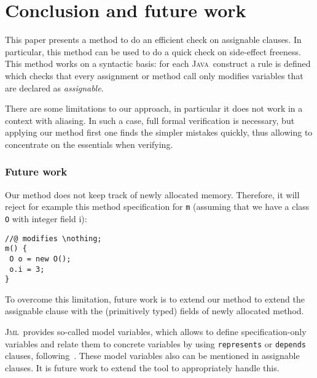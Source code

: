 \documentclass[a4paper]{llncs}
\newcommand{\jml}{\textsc{Jml}}
\newcommand{\java}{\textsc{Java}}
\newcommand{\nothing}{\texttt{\(\backslash\)nothing}}
\begin{document}
\section{Conclusion and future work}
\label{sec-con-and-fut-wor}
This paper presents a method to do an efficient check on assignable
clauses. In particular, this method can be used to do a quick check on 
side-effect freeness.
This method works on a syntactic basis: 
for each \java\ construct a rule is defined which checks that every
assignment or method call only modifies variables that are declared as 
\emph{assignable}. %

There are some limitations to our approach, in particular it does not
work in a context with aliasing. In such a case, full formal
verification is necessary, but applying our method first one finds the
simpler mistakes quickly, thus allowing to concentrate on the
essentials when verifying.


\subsubsection{Future work}
Our method does not keep track of newly allocated memory. Therefore,
it will reject for example this method specification for \texttt{m}
(assuming that we have a class \texttt{O} with integer field {i}):
\begin{verbatim}
//@ modifies \nothing;
m() {
 O o = new O();
 o.i = 3;
}
\end{verbatim}
To overcome this limitation, future work is to extend our method to extend the
assignable clause with the (primitively typed) fields of newly
allocated method.

\jml\ provides so-called model variables, which allows to define
specification-only variables and relate them to concrete variables by
using \texttt{represents} or \texttt{depends} clauses,
following~\cite{Leino98}. These model variables also can be mentioned
in assignable clauses. It is future work to extend the tool to
appropriately handle this.
\end{document}
